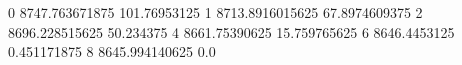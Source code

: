 0 8747.763671875 101.76953125
1 8713.8916015625 67.8974609375
2 8696.228515625 50.234375
4 8661.75390625 15.759765625
6 8646.4453125 0.451171875
8 8645.994140625 0.0
